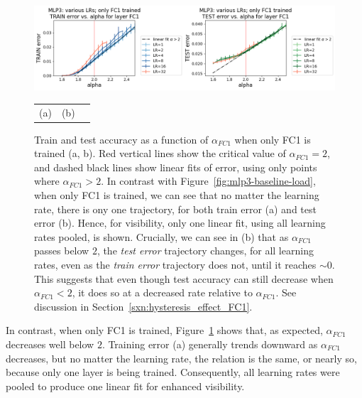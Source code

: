 \begin{figure}[t] %
    \centering
        \includegraphics[width=15cm]{img/alpha_by_scales/mlp3_error_by_LR_FC1_FC1_binned.png}
    \begin{tabular}{ccc}
      (a)\hspace{5cm} & (b) \\
    \end{tabular}
    \caption{
            Train and test accuracy as a function of $\alpha_{FC1}$ when only FC1 is trained (a, b). 
            Red vertical lines show the critical value of $\alpha_{FC1} = 2$, and dashed black lines show 
            linear fits of error, using only points where $\alpha_{FC1} > 2$. 
            In contrast with Figure~\ref{fig:mlp3-baseline-load}, when only 
            FC1 is trained, we can see that no matter the learning rate, there is ony one trajectory, for both train 
            error (a) and test error (b). Hence, for visibility, only one linear fit, using all learning rates pooled, 
            is shown. Crucially, we can see in (b) that as $\alpha_{FC1}$ passes below $2$, the \emph{test error} 
            trajectory changes, for all learning rates, even as the \emph{train error} trajectory does not, until it 
            reaches $\sim 0$. This suggests that even though test accuracy can still decrease when $\alpha_{FC1} < 2$, it 
            does so at a decreased rate relative to $\alpha_{FC1}$. See discussion in 
            Section~\ref{sxn:hysteresis_effect_FC1}.
    }
    \label{fig:mlp3-FC1-alpha-overloaded}
\end{figure}


In contrast, when only FC1 is trained, Figure~\ref{fig:mlp3-FC1-alpha-overloaded} shows that, as expected, 
$\alpha_{FC1}$ decreases well below $2$. Training error (a) generally trends downward as $\alpha_{FC1}$ decreases, 
but no matter the learning rate, the relation is the same, or nearly so, because only one layer is being trained. 
Consequently, all learning rates were pooled to produce one linear fit for enhanced visibility.

